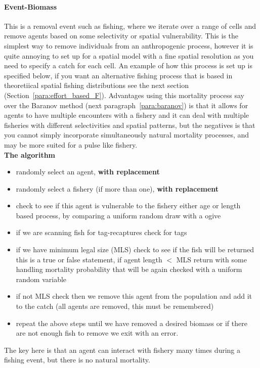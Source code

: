 \paragraph{Event-Biomass}\label{para:event_mort}
This is a removal event such as fishing, where we iterate over a range of cells and remove agents based on some selectivity or spatial vulnerability. This is the simplest way to remove individuals from an anthropogenic process, however it is quite annoying to set up for a spatial model with a fine spatial resolution as you need to specify a catch for each cell. An example of how this process is set up is specified below, if you want an alternative fishing process that is based in theoretiical spatial fishing distributions see the next section (Section~\ref{para:effort_based_F}). Advantages using this mortality process say over the Baranov method (next paragraph~\ref{para:baranov}) is that it allows for agents to have multiple encounters with a fishery and it can deal with multiple fisheries with different selectivities and spatial patterns, but the negatives is that you cannot simply incorporate simultaneously natural mortality processes, and may be more suited for a pulse like fishery.\\

\textbf{The algorithm}
\begin{itemize}
	\item randomly select an agent, \textbf{with replacement}
	\item randomly select a fishery (if more than one), \textbf{with replacement}
	\item check to see if this agent is vulnerable to the fishery either age or length based process, by comparing a uniform random draw with a ogive
	\item if we are scanning fish for tag-recaptures check for tags
	\item if we have minimum legal size (MLS) check to see if the fish will be returned this is a true or false statement, if agent length $<$ MLS return with some handling mortality probability that will be again checked with a uniform random variable
	\item if not MLS check then we remove this agent from the population and add it to the catch (all agents are removed, this must be remembered)
	\item repeat the above steps until we have removed a desired biomass or if there are not enough fish to remove we exit with an error.
\end{itemize}
The key here is that an agent can interact with fishery many times during a fishing event, but there is no natural mortality.

